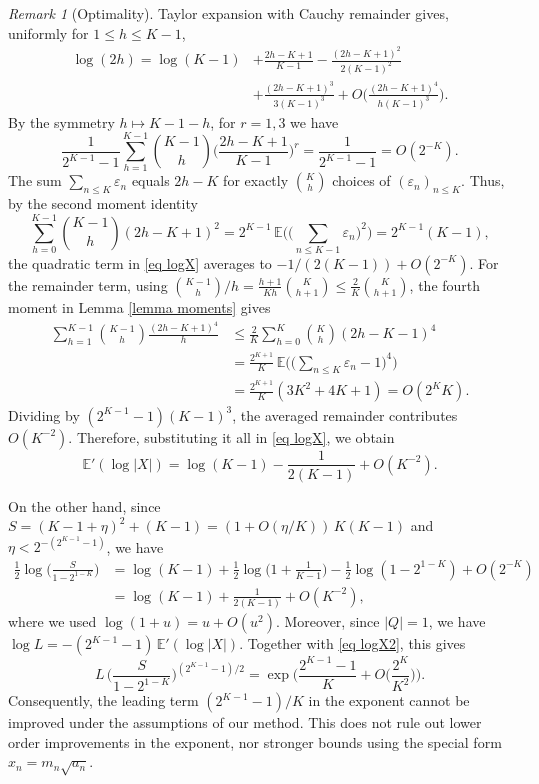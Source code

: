 \documentclass[reqno,12pt]{amsart}
\theoremstyle{remark}
\newtheorem{remark}[theorem]{Remark}
\newcommand{\EE}{\mathbb{E}}
\begin{document}
\begin{remark}[Optimality]
Taylor expansion with Cauchy remainder gives, uniformly for $1\leq h\leq K-1$,
\begin{align*}
\log(2h) = \log(K-1) &+\frac{2h-K+1}{K-1} - \frac{(2h-K+1)^2}{2(K-1)^2} \\
&+\frac{(2h-K+1)^3}{3(K-1)^3} + O\bigg(\frac{(2h-K+1)^4}{h(K-1)^3}\bigg).
\end{align*}
By the symmetry $h\mapsto K-1-h$, for $r=1,3$ we have 
$$ \frac{1}{2^{K-1}-1}\sum_{h=1}^{K-1}\binom{K-1}{h}\bigg(\frac{2h-K+1}{K-1}\bigg)^r = \frac{1}{2^{K-1}-1} = O(2^{-K}). $$
The sum $\sum_{n\leq K} \varepsilon_n$ equals $2h-K$ for exactly $\binom{K}{h}$ choices of $(\varepsilon_n)_{n\leq K}$. Thus, by the second moment identity
$$ \sum_{h=0}^{K-1}\binom{K-1}{h} (2h-K+1)^2 = 2^{K-1}\,\EE\bigg(\bigg(\sum_{n\leq K-1}\varepsilon_n\bigg)^2\bigg) = 2^{K-1}(K-1), $$
the quadratic term in \eqref{eq logX} averages to $-1/(2(K-1)) + O(2^{-K})$. For the remainder term, using $\binom{K-1}{h}/h=\frac{h+1}{Kh}\binom{K}{h+1}\leq\frac{2}{K}\binom{K}{h+1}$, the fourth moment in Lemma \ref{lemma moments} gives
\begin{align*}
\sum_{h=1}^{K-1}\binom{K-1}{h}\frac{(2h-K+1)^4}{h}
&\leq\frac{2}{K}\sum_{h=0}^{K}\binom{K}{h}(2h-K-1)^4\\
&=\frac{2^{K+1}}{K}\,\EE\bigg(\bigg(\sum_{n\leq K}\varepsilon_n-1\bigg)^4\bigg) \\
&=\frac{2^{K+1}}{K}(3K^2+4K+1)
=O(2^K K).
\end{align*}
Dividing by $(2^{K-1}-1)(K-1)^3$, the averaged remainder contributes $O(K^{-2})$. Therefore, substituting it all in \eqref{eq logX}, we obtain
\begin{equation}
 \EE'(\log|X|) = \log(K-1)-\frac{1}{2(K-1)}+O(K^{-2}). \label{eq logX2}
\end{equation}

On the other hand, since $S=(K-1+\eta)^2+(K-1) = (1+O(\eta/K))\,K(K-1)$ and $\eta < 2^{-(2^{K-1}-1)}$, we have
\begin{align*}
\frac{1}{2}\log\bigg(\frac{S}{1-2^{1-K}}\bigg) &=\log(K-1)+\frac{1}{2}\log\bigg(1+\frac1{K-1}\bigg) -\frac{1}{2}\log(1-2^{1-K})+O(2^{-K})\\
&=\log(K-1)+\frac{1}{2(K-1)}+O(K^{-2}),
\end{align*}
where we used $\log(1+u)=u+O(u^2)$. Moreover, since $|Q|=1$, we have $\log L = -(2^{K-1}-1)\,\EE'(\log|X|)$. Together with \eqref{eq logX2}, this gives
$$ L\,\bigg(\frac{S}{1-2^{1-K}}\bigg)^{(2^{K-1}-1)/2} = \exp\bigg(\frac{2^{K-1}-1}{K}+O\bigg(\frac{2^K}{K^2}\bigg)\bigg). $$
Consequently, the leading term $(2^{K-1}-1)/K$ in the exponent cannot be improved under the assumptions of our method. This does not rule out lower order improvements in the exponent, nor stronger bounds using the special form $x_n=m_n\sqrt{a_n}$.
\end{remark}
\end{document}
